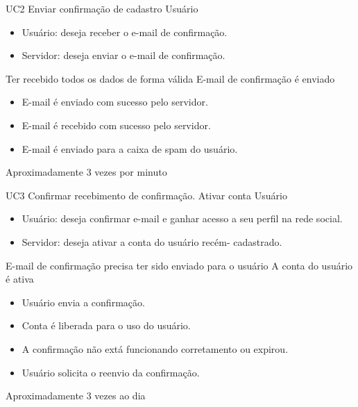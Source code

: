 \casoDeUso
{UC2}
{Enviar confirmação de cadastro}
{Usuário}
{
\begin{itemize}
	\item Usuário: deseja receber o e-mail de confirmação.
	\item Servidor: deseja enviar o e-mail de confirmação.
\end{itemize}

}
{Ter recebido todos os dados de forma válida}
{E-mail de confirmação é enviado}
{
\begin{itemize}
\item E-mail é enviado com sucesso pelo servidor.
\item E-mail é recebido com sucesso pelo servidor.
\end{itemize}
}
{
\begin{itemize}
\item E-mail é enviado para a caixa de spam do usuário.
\end{itemize}
}
{Aproximadamente 3 vezes por  minuto}
{
 
}

\casoDeUso
{UC3}
{Confirmar recebimento de confirmação. Ativar conta}
{Usuário}
{
\begin{itemize}
	\item Usuário: deseja confirmar e-mail e ganhar acesso a seu perfil na rede social.
	\item Servidor: deseja ativar a conta do usuário recém- cadastrado.
\end{itemize}

}
{E-mail de confirmação precisa ter sido enviado para o usuário}
{A conta do usuário é ativa}
{
\begin{itemize}
\item Usuário envia a confirmação.
\item Conta é liberada para o uso do usuário.
\end{itemize}
}
{
\begin{itemize}
\item A confirmação não extá funcionando corretamento ou expirou.
\item Usuário solicita o reenvio da confirmação.
\end{itemize}
}
{Aproximadamente 3 vezes ao dia}
{

}


